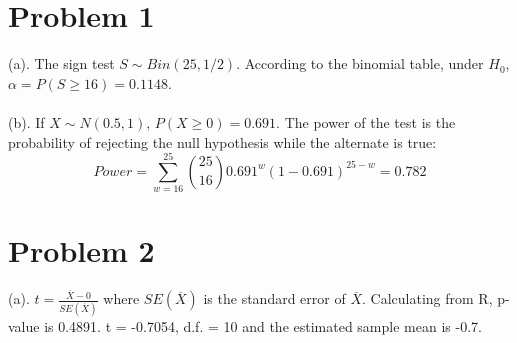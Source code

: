 \documentclass[twoside,11pt]{homework}
\begin{document}
\maketitle

\section*{Problem 1}
(a).
The sign test $S \sim Bin(25, 1/2)$. 
According to the binomial table, under $H_0$, $\alpha = P(S \ge 16) = 0.1148$.
\\\\
(b).
If $X \sim N(0.5, 1)$, $P(X \ge 0) = 0.691$.
The power of the test is the probability of rejecting the null hypothesis while the alternate is true:
%
\begin{equation}
Power = \sum\limits_{w=16}^{25}{25\choose 16} 0.691^w (1-0.691)^{25-w} = 0.782
\end{equation}
%


\section*{Problem 2}
(a).
$t = \frac{\overline{X}-0}{SE(\overline{X})}$ where $SE(\overline{X})$ is the standard error of $\overline{X}$.
Calculating from R,  p-value is 0.4891.
t = -0.7054, d.f. = 10 and the estimated sample mean is -0.7.
\end{document}
